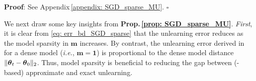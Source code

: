 \begin{myprop}
\textbf{Proof}: 
See Appendix\,\ref{appendix: SGD_sparse_MU}. 
\hfill $\square$
\end{myprop}
We next draw some key insights   from \textbf{Prop.\,\ref{prop: SGD_sparse_MU}}. \textit{First},  it is clear from  \eqref{eq: err_bd_SGD_sparse} that the unlearning error reduces as the model sparsity in $\mathbf m$ increases. 
By contrast, the unlearning error  derived in  \citet{thudi2021unrolling} for a  dense model  (\textit{i.e.}, $\mathbf{m} = \mathbf 1$) is proportional to the dense model distance $\| \boldsymbol{\theta}_t - \boldsymbol{\theta}_0 \|_2$. 
Thus,   model sparsity  is beneficial to reducing the gap between ({\GA}-based) approximate and exact unlearning. 
